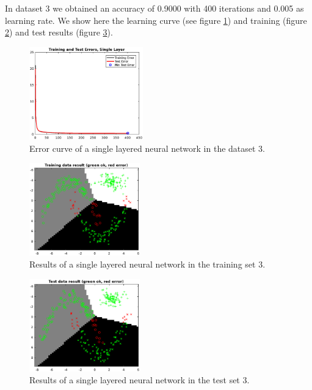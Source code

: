 \documentclass{article}
\begin{document}
In dataset 3 we obtained an accuracy of 0.9000 with 400 iterations and 0.005 as learning rate. We show here the learning curve (see figure \ref{fig:single_data3_error}) and training (figure \ref{fig:single_data3_result_train}) and test results (figure \ref{fig:single_data3_result_test}).

\begin{figure}[!htb]
\centering
\includegraphics[height=4cm]{images/single_data3_error}
\caption{Error curve of a single layered neural network in the dataset 3.}
\label{fig:single_data3_error}
\end{figure}

\begin{figure}[!htb]
\centering
\includegraphics[height=4cm]{images/single_data3_result_train}
\caption{Results of a single layered neural network in the training set 3.}
\label{fig:single_data3_result_train}
\end{figure}

\begin{figure}[!htb]
\centering
\includegraphics[height=4cm]{images/single_data3_result_test}
\caption{Results of a single layered neural network in the test set 3.}
\label{fig:single_data3_result_test}
\end{figure}
\end{document}
